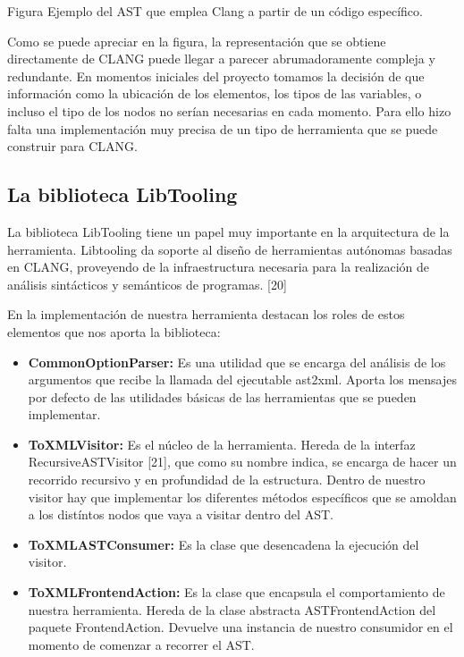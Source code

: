 %
{Figura Ejemplo del AST que emplea Clang a partir de un c\'odigo espec\'ifico.}

Como se puede apreciar en la figura, la representaci\'on que se obtiene directamente de CLANG puede llegar a parecer abrumadoramente compleja y redundante. En momentos iniciales del proyecto tomamos la decisi\'on de que informaci\'on como la ubicaci\'on de los elementos, los tipos de las variables, o incluso el tipo de los nodos no ser\'ian necesarias en cada momento. Para ello hizo falta una implementaci\'on muy precisa de un tipo de herramienta que se puede construir para CLANG.

\subsection{La biblioteca LibTooling}

La biblioteca LibTooling tiene un papel muy importante en la arquitectura de la herramienta. Libtooling da soporte al dise\~no de herramientas aut\'onomas basadas en CLANG, proveyendo de la infraestructura necesaria para la realizaci\'on de an\'alisis sint\'acticos y sem\'anticos de programas. [20]

En la implementaci\'on de nuestra herramienta destacan los roles de estos elementos que nos aporta la biblioteca:

\begin{itemize}
\item \textbf{CommonOptionParser:} Es una utilidad que se encarga del an\'alisis de
los argumentos que recibe la llamada del ejecutable ast2xml. Aporta los
mensajes por defecto de las utilidades b\'asicas de las herramientas que
se pueden implementar.
\item \textbf{ToXMLVisitor:} Es el n\'ucleo de la herramienta. Hereda de la interfaz RecursiveASTVisitor [21], que como su nombre indica, se encarga de hacer un recorrido recursivo y en profundidad de la estructura. Dentro de nuestro visitor hay que implementar los diferentes m\'etodos espec\'ificos que se amoldan a los dist\'intos nodos que vaya a visitar dentro del AST.
\item \textbf{ToXMLASTConsumer:} Es la clase que desencadena la ejecuci\'on del visitor.
\item \textbf{ToXMLFrontendAction:} Es la clase que encapsula el comportamiento de nuestra herramienta. Hereda de la clase abstracta ASTFrontendAction del paquete FrontendAction. Devuelve una instancia de nuestro consumidor en el momento de comenzar a recorrer el AST.
\end{itemize}

